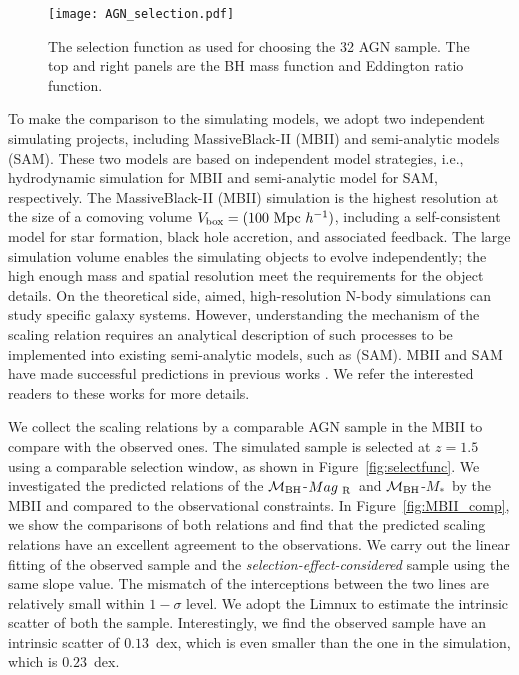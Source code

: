 \documentclass{natureprintstyle}
\newcommand{\mbh}{$\mathcal M_{\rm BH}$}
\newcommand{\mr}{$Mag_{\rm ~R}$}
\newcommand{\mstar}{{$M_*$}}
\begin{document}
\begin{figure}[t]
\texttt{[image: AGN\_selection.pdf]}
\caption{The selection function as used for choosing the 32 AGN sample. The top and right panels are the BH mass function and Eddington ratio function.
}
\label{fig:AGN_select}
\end{figure}

To make the comparison to the simulating models, we adopt two independent simulating projects, including MassiveBlack-II (MBII) and semi-analytic models (SAM). These two models are based on independent model strategies, i.e., hydrodynamic simulation for MBII and semi-analytic model for SAM, respectively. The MassiveBlack-II (MBII) simulation is the highest resolution at the size of a comoving volume $V_{\rm box} = (100~{\rm Mpc}~h^{-1})$, including a self-consistent model for star formation, black hole accretion, and associated feedback. The large simulation volume enables the simulating objects to evolve independently; the high enough mass and spatial resolution meet the requirements for the object details. On the theoretical side, aimed, high-resolution N-body simulations can study specific galaxy systems. However, understanding the mechanism of the scaling relation requires an analytical description of such processes to be implemented into existing semi-analytic models, such as (SAM). 
MBII and SAM have made successful predictions in previous works \cite{Menci2014, Menci2016, Khandai2015}. We refer the interested readers to these works for more details.


We collect the scaling relations by a comparable AGN sample in the MBII to compare with the observed ones. The simulated sample is selected at $z=1.5$ using a comparable selection window, as shown in Figure~\ref{fig:selectfunc}. We investigated the predicted relations of the \mbh-\mr\ and \mbh-\mstar\ by the MBII and compared to the observational constraints. In Figure~\ref{fig:MBII_comp}, we show the comparisons of both relations and find that the predicted scaling relations have an excellent agreement to the observations. We carry out the linear fitting of the observed sample and the {\it selection-effect-considered} sample using the same slope value. The mismatch of the interceptions between the two lines are relatively small within $1-\sigma$ level. We adopt the {\sc Limnux} to estimate the intrinsic scatter of both the sample. Interestingly, we find the observed sample have an intrinsic scatter of $0.13$~dex, which is even smaller than the one in the simulation, which is $0.23$~dex.
\end{document}
